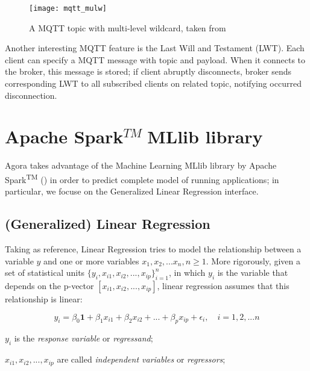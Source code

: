 \begin{figure}[htb]

    \centering
    \texttt{[image: mqtt\_mulw]}
    \caption[A MQTT topic with multi-level wildcard]{A MQTT topic with multi-level wildcard, taken from \cite{site:hivemq}}
    \label{fig:mqtt_mulw}

\end{figure}

Another interesting MQTT feature is the Last Will and Testament (LWT). Each client can specify a MQTT message with topic and payload. When it connects to the broker, this message is stored; if client abruptly disconnects, broker sends corresponding LWT to all subscribed clients on related topic, notifying occurred disconnection.





\section{Apache Spark\texorpdfstring{$^{TM}\;$}MMLlib library}

Agora takes advantage of the Machine Learning MLlib library by Apache Spark\textsuperscript{TM} (\cite{spark2015apache}) in order to predict complete model of running applications; in particular, we focuse on the Generalized Linear Regression interface.


\subsection{(Generalized) Linear Regression}\label{glr}

Taking \cite{site:caltechML2012} as reference, Linear Regression tries to model the relationship between a variable $y$ and one or more variables $x_1,x_2,...x_n,n\ge1$. More rigorously, given a set of statistical units $\{y_i,x_{i1},x_{i2},...,x_{ip}\}_{i = 1}^n$, in which $y_i$ is the variable that depends on the p-vector $[x_{i1}, x_{i2}, ..., x_{ip}]$, linear regression assumes that this relationship is linear:

\begin{equation}
    y_i = \beta_0\boldsymbol{1} + \beta_1x_{i1} + \beta_2x_{i2} + ... +  \beta_px_{ip} + \epsilon_i, \quad i = 1, 2, ... n
\end{equation}

$y_i$ is the \textit{response variable} or \textit{regressand};

$x_{i1}, x_{i2}, ..., x_{ip}$ are called \textit{independent variables} or \textit{regressors};

